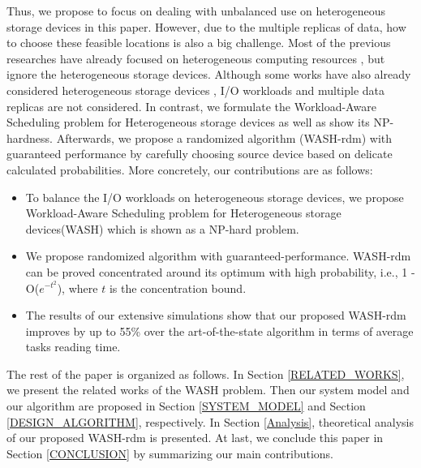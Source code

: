 \documentclass[conference]{IEEEtran}
\begin{document}
Thus, we propose to focus on dealing with unbalanced use on heterogeneous storage devices in this paper. However, due to the multiple replicas of data, how to choose these feasible locations is also a big challenge.
Most of the previous researches have already focused on heterogeneous computing resources \cite{b25}\cite{b26}\cite{b35}\cite{b36}, but ignore the heterogeneous storage devices. Although some works have also already considered heterogeneous storage devices \cite{b6}\cite{b7}, I/O workloads and multiple data replicas are not considered. In contrast, we formulate the Workload-Aware Scheduling problem for Heterogeneous storage devices as well as show its NP-hardness. Afterwards, we propose a randomized algorithm (WASH-rdm) with guaranteed performance by carefully choosing source device based on delicate calculated probabilities.
More concretely, our contributions are as follows: 

\begin{itemize}
\item To balance the I/O workloads on heterogeneous storage devices, we propose Workload-Aware Scheduling problem for Heterogeneous storage devices(WASH) which is shown as a NP-hard problem. 
\item We propose randomized algorithm with guaranteed-performance. WASH-rdm can be proved concentrated around its optimum with high probability, i.e., 1 - O($e^{-t^2}$), where $t$ is the concentration bound.
\item The results of our extensive simulations show that our proposed WASH-rdm improves by up to 55\% over the art-of-the-state algorithm in terms of average tasks reading time.
\end{itemize}

The rest of the paper is organized as follows. In Section \ref{RELATED_WORKS}, we present the related works of the WASH problem. 
Then our system model and our algorithm are proposed in Section \ref{SYSTEM_MODEL} and Section \ref{DESIGN_ALGORITHM}, respectively. 
In Section \ref{Analysis}, theoretical analysis of our proposed WASH-rdm is presented.
At last, we conclude this paper in Section \ref{CONCLUSION} by summarizing our main contributions.
\end{document}
